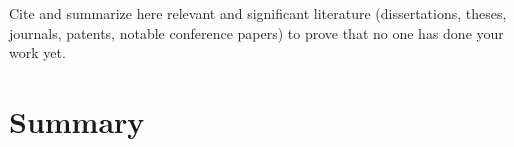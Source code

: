 Cite and summarize here relevant and significant literature (dissertations, theses, journals, patents, notable conference papers) to prove that no one has done your work yet. 


\Blindtext

\section{Summary}




